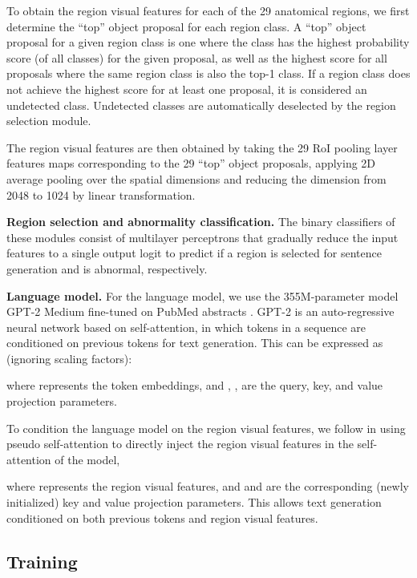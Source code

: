 \documentclass[10pt,twocolumn,letterpaper]{article}
\begin{document}
To obtain the region visual features for each of the 29 anatomical regions, we first determine the “top” object proposal for each region class. A “top” object proposal for a given region class is one where the class has the highest probability score (of all classes) for the given proposal, as well as the highest score for all proposals where the same region class is also the top-1 class. If a region class does not achieve the highest score for at least one proposal, it is considered an undetected class. Undetected classes are automatically deselected by the region selection module.

The region visual features  are then obtained by taking the 29 RoI pooling layer features maps  corresponding to the 29 “top” object proposals, applying 2D average pooling over the spatial dimensions and reducing the dimension from 2048 to 1024 by linear transformation.


\noindent\textbf{Region selection and abnormality classification.} The binary classifiers of these modules consist of multilayer perceptrons that gradually reduce the input features to a single output logit to predict if a region is selected for sentence generation and is abnormal, respectively.

\noindent\textbf{Language model.} For the language model, we use the 355M-parameter model GPT-2 Medium \cite{radford2019language} fine-tuned on PubMed  abstracts \cite{papanikolaou2020dare}. GPT-2 is an auto-regressive neural network based on self-attention, in which tokens in a sequence are conditioned on previous tokens for text generation. This can be expressed as (ignoring scaling factors):

where  represents the token embeddings, and , ,  are the query, key, and value projection parameters.

To condition the language model on the region visual features, we follow \cite{alfarghaly2021automated} in using pseudo self-attention \cite{ziegler2019encoder} to directly inject the region visual features in the self-attention of the model, \ie

where  represents the region visual features, and  and  are the corresponding (newly initialized) key and value projection parameters. This allows text generation conditioned on both previous tokens and region visual features.

\subsection{Training}
\end{document}
